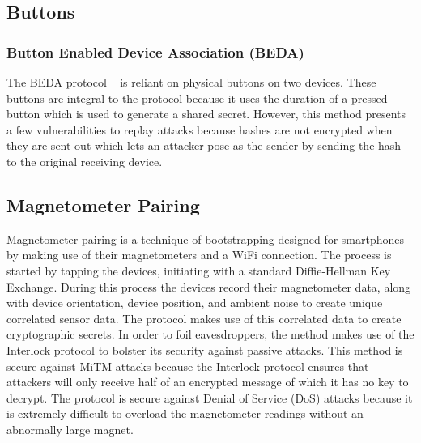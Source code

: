 

\subsection{Buttons}
\subsubsection{Button Enabled Device Association (BEDA)}
The BEDA protocol ~\cite{soriente2007beda} is reliant on physical buttons on two devices.
These buttons are integral to the protocol because it uses the duration of a pressed button which is used to generate a shared secret.
However, this method presents a few vulnerabilities to replay attacks because hashes are not encrypted when they are sent out which lets an attacker pose as the sender by sending the hash to the original receiving device.



\subsection{Magnetometer Pairing}
Magnetometer pairing is a technique of bootstrapping designed for smartphones by making use of their magnetometers and a WiFi connection. The process is started by tapping the devices, initiating with a standard Diffie-Hellman Key Exchange. During this process the devices record their magnetometer data, along with device orientation, device position, and ambient noise to create unique correlated sensor data. The protocol makes use of this correlated data to create cryptographic secrets. In order to foil eavesdroppers, the method makes use of the Interlock protocol to bolster its security against passive attacks. This method is secure against MiTM attacks because the Interlock protocol ensures that attackers will only receive half of an encrypted message of which it has no key to decrypt. The protocol is secure against Denial of Service (DoS) attacks because it is extremely difficult to overload the magnetometer readings without an abnormally large magnet.

